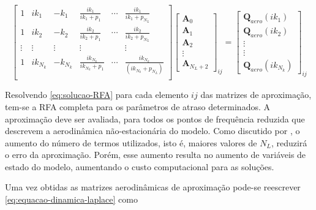 \begin{equation}\label{eq:solucao-RFA}
    \begin{bmatrix}
    1 & ik_{1} & -k_{1} & \frac{ik_{1}}{ik_{1}+p_{1}} & \cdots & \frac{ik_{1}}{ik_{1}+p_{N_{L}}} \\
    1 & ik_{2} & -k_{2} & \frac{ik_{2}}{ik_{2}+p_{1}} & \cdots & \frac{ik_{2}}{ik_{2}+p_{N_{L}}} \\
    \vdots & \vdots & \vdots & \vdots & & \vdots \\
    1 & ik_{N_{k}} & -k_{N_{k}} & \frac{ik_{N_{k}}}{ik_{N_{k}}+p_{1}} & \cdots & \frac{ik_{N_{k}}}{ (ik_{N_{k}}+p_{N_{L}}) } \\
    \end{bmatrix} 
    \begin{bmatrix}
    \boldsymbol{A}_{0} \\ \boldsymbol{A}_{1} \\ \boldsymbol{A}_{2} \\ \vdots \\ \boldsymbol{A}_{N_{L}+2}
    \end{bmatrix} _{ij}
    = 
    \begin{bmatrix}
    \boldsymbol{Q}_{aero}(ik_{1}) \\ \boldsymbol{Q}_{aero}(ik_{2}) \\ \vdots \\ \vdots \\ \boldsymbol{Q}_{aero}(ik_{N_{k}})
    \end{bmatrix} _{ij}
\end{equation}

Resolvendo \eqref{eq:solucao-RFA} para cada elemento $ij$ das matrizes de aproximação, tem-se a \gls{RFA} completa para os parâmetros de atraso determinados. A aproximação deve ser avaliada, para todos os pontos de frequência reduzida que descrevem a aerodinâmica não-estacionária do modelo. Como discutido por \textcite{ZAERO-Theoretical-Manual:2017}, o aumento do número de termos utilizados, isto é, maiores valores de $N_{L}$, reduzirá o erro da aproximação. Porém, esse aumento resulta no aumento de variáveis de estado do modelo, aumentando o custo computacional para as soluções.

Uma vez obtidas as matrizes aerodinâmicas de aproximação pode-se reescrever \eqref{eq:equacao-dinamica-laplace} como

